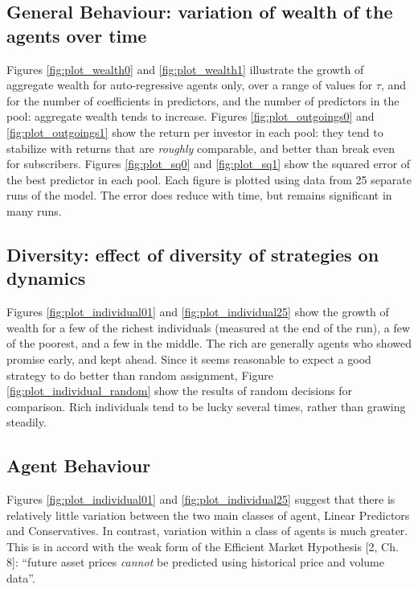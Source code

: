 \documentclass[]{article}
\begin{document}
\subsection{General Behaviour: variation of wealth of the agents over
time}\label{general-behaviour-variation-of-wealth-of-the-agents-over-time}

Figures \ref{fig:plot_wealth0} and \ref{fig:plot_wealth1} illustrate the
growth of aggregate wealth for auto-regressive agents only, over a range
of values for \(\tau\), and for the number of coefficients in
predictors, and the number of predictors in the pool: aggregate wealth
tends to increase. Figures \ref{fig:plot_outgoings0} and
\ref{fig:plot_outgoings1} show the return per investor in each pool:
they tend to stabilize with returns that are \emph{roughly} comparable,
and better than break even for subscribers. Figures \ref{fig:plot_sq0}
and \ref{fig:plot_sq1} show the squared error of the best predictor in
each pool. Each figure is plotted using data from 25 separate runs of
the model. The error does reduce with time, but remains significant in
many runs.

\subsection{Diversity: effect of diversity of strategies on
dynamics}\label{diversity-effect-of-diversity-of-strategies-on-dynamics}

Figures \ref{fig:plot_individual01} and \ref{fig:plot_individual25} show
the growth of wealth for a few of the richest individuals (measured at
the end of the run), a few of the poorest, and a few in the middle. The
rich are generally agents who showed promise early, and kept ahead.
Since it seems reasonable to expect a good strategy to do better than
random assignment, Figure \ref{fig:plot_individual_random} show the
results of random decisions for comparison. Rich individuals tend to be
lucky several times, rather than grawing steadily.

\subsection{Agent Behaviour}\label{agent-behaviour}

Figures \ref{fig:plot_individual01} and \ref{fig:plot_individual25}
suggest that there is relatively little variation between the two main
classes of agent, Linear Predictors and Conservatives. In contrast,
variation within a class of agents is much greater. This is in accord
with the weak form of the Efficient Market Hypothesis {[}2, Ch. 8{]}:
``future asset prices \emph{cannot} be predicted using historical price
and volume data''.
\end{document}

